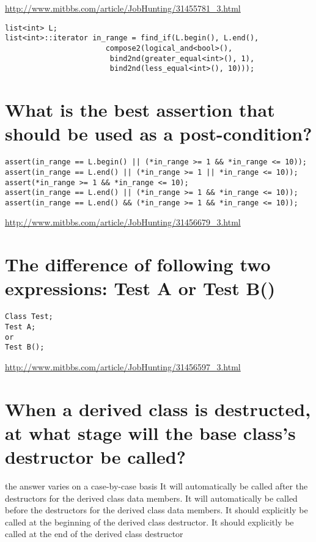 \documentclass[12pt]{book}
\begin{document}
\url{http://www.mitbbs.com/article/JobHunting/31455781_3.html}

\lstset{language=java,label= ,caption= ,numbers=none}
\begin{lstlisting}
list<int> L;
list<int>::iterator in_range = find_if(L.begin(), L.end(),
				       compose2(logical_and<bool>(),
						bind2nd(greater_equal<int>(), 1),
						bind2nd(less_equal<int>(), 10)));
\end{lstlisting}
\section{What is the best assertion that should be used as a post-condition?}
\label{sec-13-5}
\lstset{language=java,label= ,caption= ,numbers=none}
\begin{lstlisting}
assert(in_range == L.begin() || (*in_range >= 1 && *in_range <= 10));
assert(in_range == L.end() || (*in_range >= 1 || *in_range <= 10));
assert(*in_range >= 1 && *in_range <= 10);
assert(in_range == L.end() || (*in_range >= 1 && *in_range <= 10));
assert(in_range == L.end() && (*in_range >= 1 && *in_range <= 10));
\end{lstlisting}

\url{http://www.mitbbs.com/article/JobHunting/31456679_3.html}

\section{The difference of following two expressions: Test A or Test B()}
\label{sec-13-6}
\lstset{language=java,label= ,caption= ,numbers=none}
\begin{lstlisting}
Class Test;
Test A;
or
Test B();
\end{lstlisting}

\url{http://www.mitbbs.com/article/JobHunting/31456597_3.html}

\section{When a derived class is destructed, at what stage will the base class's destructor be called?}
\label{sec-13-7}
the answer varies on a case-by-case basis
It will automatically be called after the destructors for the derived class data members. It will automatically be called before the destructors for the derived class data members. It should explicitly be called at the beginning of the derived class destructor. It should explicitly be called at the end of the derived class destructor
\end{document}
